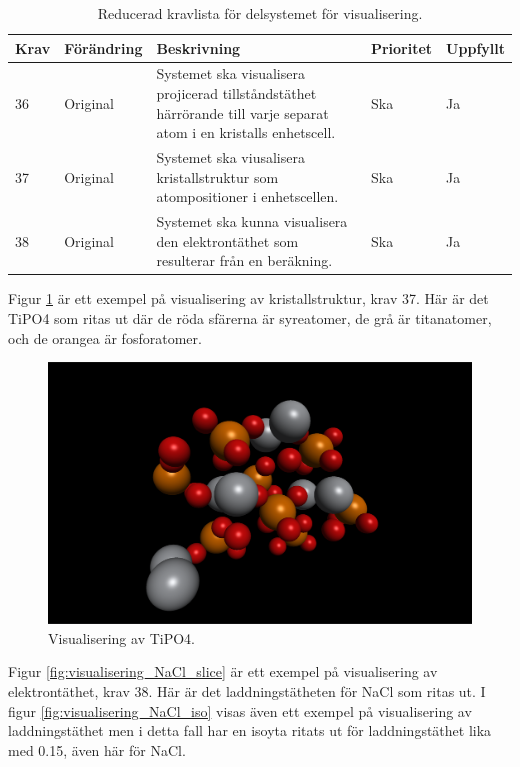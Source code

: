 \documentclass[a4paper,12pt,twoside,openright]{report}
\begin{document}
\begin{table}[H]
\caption{Reducerad kravlista för delsystemet för visualisering.}
\begin{center}
\begin{tabular}{ |p{10mm}|p{20mm}|p{70mm}|p{15mm}|p{15mm}|}
\hline
 \textbf{Krav} & \textbf{Förändring} & \textbf{Beskrivning} & \textbf{Prioritet} & \textbf{Uppfyllt}  \\ 
\hline
36 & Original & Systemet ska visualisera projicerad tillståndstäthet härrörande till varje separat atom i en kristalls enhetscell. & Ska & Ja \\
\hline
37 & Original & Systemet ska viusalisera kristallstruktur som atompositioner i enhetscellen. & Ska & Ja \\
\hline
38 & Original & Systemet ska kunna visualisera den elektrontäthet som resulterar från en beräkning. & Ska & Ja \\
\hline
\end{tabular}
\label{table:kravlista visualisering}
\end{center}
\end{table}

Figur \ref{fig:visualisering_TiPO4} är ett exempel på visualisering av kristallstruktur, krav 37. Här är det TiPO4 som ritas ut där de röda sfärerna är syreatomer, de grå är titanatomer, och de orangea är fosforatomer.
\begin{figure}[H]
	\centering
	\includegraphics[scale=0.15]{TiPO4_visualisering.png}
	\caption{Visualisering av TiPO4.}
	\label{fig:visualisering_TiPO4}
\end{figure}

Figur \ref{fig:visualisering_NaCl_slice} är ett exempel på visualisering av elektrontäthet, krav 38. Här är det laddningstätheten för NaCl som ritas ut. I figur  \ref{fig:visualisering_NaCl_iso} visas även ett exempel på visualisering av laddningstäthet men i detta fall har en isoyta ritats ut för laddningstäthet lika med 0.15, även här för NaCl.
\end{document}
